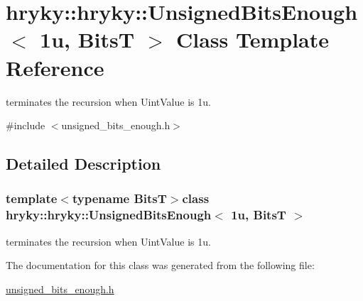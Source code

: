 \hypertarget{classhryky_1_1hryky_1_1_unsigned_bits_enough_3_011u_00_01_bits_t_01_4}{\section{hryky\-:\-:hryky\-:\-:Unsigned\-Bits\-Enough$<$ 1u, Bits\-T $>$ Class Template Reference}
\label{classhryky_1_1hryky_1_1_unsigned_bits_enough_3_011u_00_01_bits_t_01_4}
}


terminates the recursion when Uint\-Value is 1u.  




{\ttfamily \#include $<$unsigned\-\_\-bits\-\_\-enough.\-h$>$}



\subsection{Detailed Description}
\subsubsection*{template$<$typename Bits\-T$>$class hryky\-::hryky\-::\-Unsigned\-Bits\-Enough$<$ 1u, Bits\-T $>$}

terminates the recursion when Uint\-Value is 1u. 

The documentation for this class was generated from the following file\-:\begin{DoxyCompactItemize}
\item 
\hyperlink{unsigned__bits__enough_8h}{unsigned\-\_\-bits\-\_\-enough.\-h}\end{DoxyCompactItemize}
